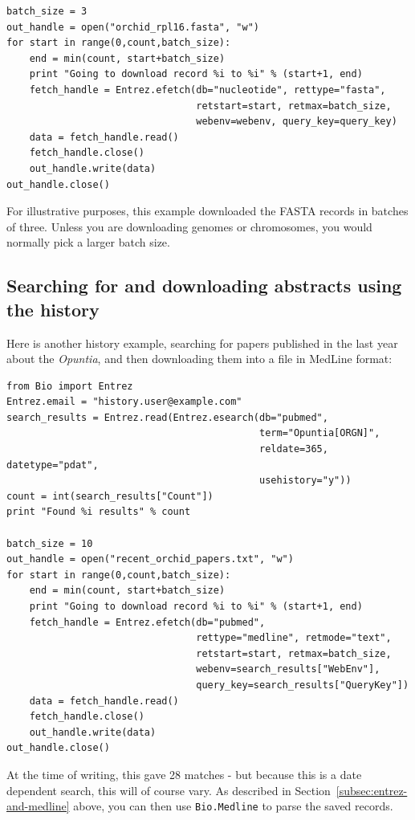 \documentclass{report}
\begin{document}
\begin{verbatim}
batch_size = 3
out_handle = open("orchid_rpl16.fasta", "w")
for start in range(0,count,batch_size):
    end = min(count, start+batch_size)
    print "Going to download record %i to %i" % (start+1, end)
    fetch_handle = Entrez.efetch(db="nucleotide", rettype="fasta",
                                 retstart=start, retmax=batch_size,
                                 webenv=webenv, query_key=query_key)
    data = fetch_handle.read()
    fetch_handle.close()
    out_handle.write(data)
out_handle.close()
\end{verbatim}

\noindent For illustrative purposes, this example downloaded the FASTA records in batches of three.  Unless you are downloading genomes or chromosomes, you would normally pick a larger batch size.

\subsection{Searching for and downloading abstracts using the history}
Here is another history example, searching for papers published in the last year about the \textit{Opuntia}, and then downloading them into a file in MedLine format:

\begin{verbatim}
from Bio import Entrez
Entrez.email = "history.user@example.com"
search_results = Entrez.read(Entrez.esearch(db="pubmed",
                                            term="Opuntia[ORGN]",
                                            reldate=365, datetype="pdat",
                                            usehistory="y"))
count = int(search_results["Count"])
print "Found %i results" % count

batch_size = 10
out_handle = open("recent_orchid_papers.txt", "w")
for start in range(0,count,batch_size):
    end = min(count, start+batch_size)
    print "Going to download record %i to %i" % (start+1, end)
    fetch_handle = Entrez.efetch(db="pubmed",
                                 rettype="medline", retmode="text",
                                 retstart=start, retmax=batch_size,
                                 webenv=search_results["WebEnv"],
                                 query_key=search_results["QueryKey"])
    data = fetch_handle.read()
    fetch_handle.close()
    out_handle.write(data)
out_handle.close()
\end{verbatim}

\noindent At the time of writing, this gave 28 matches - but because this is a date dependent search, this will of course vary.  As described in Section~\ref{subsec:entrez-and-medline} above, you can then use \verb|Bio.Medline| to parse the saved records.
\end{document}
